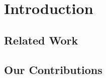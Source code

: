 \section{Introduction} 
\label{sec:intro}



\subsection{Related Work} 
\label{sec:intro:priorart}



\subsection{Our Contributions} 
\label{sec:intro:solu}
